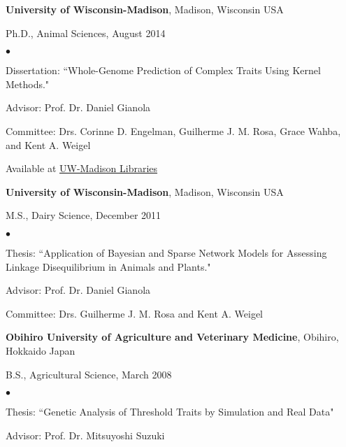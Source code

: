 \documentclass[margin,line,10pt]{res}
\newenvironment{list1}{
  \begin{list}{\ding{113}}{%
      \setlength{\itemsep}{0in}
      \setlength{\parsep}{0in} \setlength{\parskip}{0in}
      \setlength{\topsep}{0in} \setlength{\partopsep}{0in} 
      \setlength{\leftmargin}{0.17in}}}{\end{list}}
\newenvironment{list2}{
  \begin{list}{$\bullet$}{%
      \setlength{\itemsep}{0in}
      \setlength{\parsep}{0in} \setlength{\parskip}{0in}
      \setlength{\topsep}{0in} \setlength{\partopsep}{0in} 
      \setlength{\leftmargin}{0.2in}}}{\end{list}}
\begin{document}
\begin{resume}
{\bf University of Wisconsin-Madison}, Madison, Wisconsin USA\\
\vspace*{-.1in}
\begin{list1}
\item[] Ph.D., Animal Sciences, August 2014
\begin{list2}
\vspace*{.05in}
\item Dissertation: ``Whole-Genome Prediction of Complex Traits Using Kernel Methods." 
\item Advisor: Prof. Dr. Daniel Gianola 
\item Committee: Drs. Corinne D. Engelman, Guilherme J. M. Rosa, Grace Wahba, and Kent A. Weigel
\item Available at  \textcolor{blue}{\href{https://search.library.wisc.edu/catalog/9910205835702121}{UW-Madison Libraries}} 
\end{list2}
\vspace*{.05in}
\end{list1}





{\bf University of Wisconsin-Madison}, Madison, Wisconsin USA\\
\vspace*{-.1in}
\begin{list1}
\item[] M.S., Dairy Science, December 2011
\begin{list2}
\vspace*{.05in}
\item Thesis: ``Application of Bayesian and Sparse Network Models for Assessing Linkage Disequilibrium in Animals and Plants." 
\item Advisor: Prof. Dr. Daniel Gianola 
\item Committee: Drs. Guilherme J. M. Rosa and Kent A. Weigel
\end{list2}
\vspace*{.05in}
\end{list1}


{\bf Obihiro University of Agriculture and Veterinary Medicine}, Obihiro, Hokkaido Japan\\
\vspace*{-.1in}
\begin{list1}
\item[] B.S., Agricultural Science,  March 2008
\begin{list2}
\vspace*{.05in}
\item Thesis:  ``Genetic Analysis of Threshold Traits by Simulation and Real Data" 
\item Advisor: Prof. Dr. Mitsuyoshi Suzuki
\end{list2}
\end{list1}





\end{resume}
\end{document}
